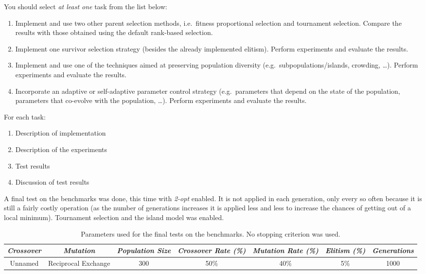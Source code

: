 You should select \emph{at least one} task from the list below:
{\small
\begin{enumerate}
\item Implement and use two other parent selection methods, i.e.\  fitness proportional selection and tournament selection. Compare the results with those obtained using the default rank-based selection. 
\item Implement one survivor selection strategy (besides the already implemented elitism). Perform experiments and evaluate the results. 
\item Implement and use one of the techniques aimed at preserving population diversity (e.g.\ subpopulations/islands, crowding, \ldots). Perform experiments and evaluate the results.
\item Incorporate an adaptive or self-adaptive parameter control strategy (e.g.\  parameters that depend on the state of the population, parameters that co-evolve with the population, \ldots). Perform experiments and evaluate the results. 
\end{enumerate}
}

\noindent
For each task:
\begin{enumerate}
\item	 Description of implementation
\item	 Description of the experiments
\item Test results
\item Discussion of test results
\end{enumerate}


A final test on the benchmarks was done, this time with \textit{2-opt} enabled. It is not applied in each generation, only every so often because it is still a fairly costly operation (as the number of generations increases it is applied less and less to increase the chances of getting out of a local minimum). Tournament selection and the island model was enabled.

\begin{table}[h]
\centering
\footnotesize
\begin{tabular}{c|c|c|c|c|c|c}
\textit{Crossover} & \textit{Mutation} & \textit{Population Size} & \textit{Crossover Rate (\%)} & \textit{Mutation Rate (\%)} & \textit{Elitism (\%)} & \textit{Generations} \\\hline 
Unnamed & Reciprocal Exchange & 300 & 50\% & 40\% & 5\% & 1000
\end{tabular}
\caption{Parameters used for the final tests on the benchmarks. No stopping criterion was used.}
\label{tab:par2}
\end{table}


